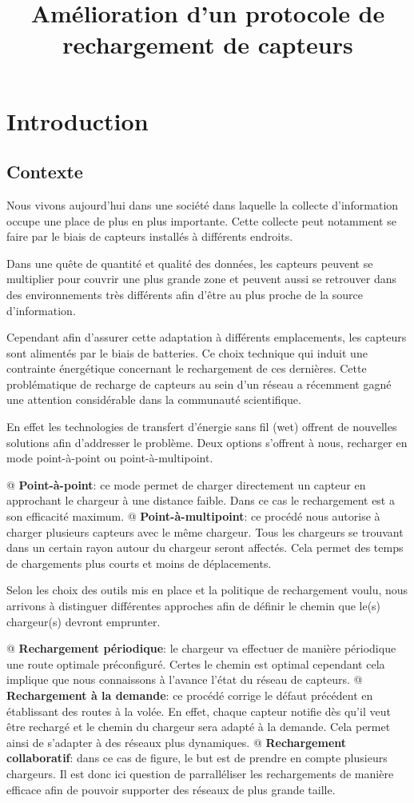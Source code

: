 \documentclass[noposter]{polytech}
\title{Amélioration d'un protocole de rechargement de capteurs}
\begin{document}
\chapter{Introduction}
	\section{Contexte}%
		Nous vivons aujourd'hui dans une société dans laquelle la collecte d'information occupe une place de plus en plus importante.
		Cette collecte peut notamment se faire par le biais de capteurs installés à différents endroits.
		
		
		Dans une quête de quantité et qualité des données, les capteurs peuvent se multiplier pour couvrir une plus grande zone et peuvent aussi se retrouver dans des environnements très différents afin d'être au plus proche de la source d'information.
		
		Cependant afin d'assurer cette adaptation à différents emplacements, les capteurs sont alimentés par le biais de batteries. 
		Ce choix technique qui induit une contrainte énergétique concernant le rechargement de ces dernières.
		Cette problématique de recharge de capteurs au sein d'un réseau a récemment gagné une attention considérable dans la communauté scientifique.
		
		En effet les technologies de transfert d'énergie sans fil (\gls{wet}) offrent de nouvelles solutions afin d'addresser le problème.
		Deux options s'offrent à nous, recharger en mode point-à-point ou point-à-multipoint.
		\begin{easylist}[itemize]
			@ \textbf{Point-à-point}: ce mode permet de charger directement un capteur en approchant le chargeur à une distance faible.
			Dans ce cas le rechargement est a son efficacité maximum.
			@ \textbf{Point-à-multipoint}: ce procédé nous autorise à charger plusieurs capteurs avec le même chargeur.
			Tous les chargeurs se trouvant dans un certain rayon autour du chargeur seront affectés.
			Cela permet des temps de chargements plus courts et moins de déplacements.
		\end{easylist}
	
		Selon les choix des outils mis en place et la politique de rechargement voulu, nous arrivons à distinguer différentes approches afin de définir le chemin que le(s) chargeur(s) devront emprunter.
		\begin{easylist}[itemize]
			@ \textbf{Rechargement périodique}: le chargeur va effectuer de manière périodique une route optimale préconfiguré.
			Certes le chemin est optimal cependant cela implique que nous connaissons à l'avance l'état du réseau de capteurs.
			@ \textbf{Rechargement à la demande}: ce procédé corrige le défaut précédent en établissant des routes à la volée.
			En effet, chaque capteur notifie dès qu'il veut être rechargé et le chemin du chargeur sera adapté à la demande.
			Cela permet ainsi de s'adapter à des réseaux plus dynamiques.
			@ \textbf{Rechargement collaboratif}: dans ce cas de figure, le but est de prendre en compte plusieurs chargeurs.
			Il est donc ici question de parralléliser les rechargements de manière efficace afin de pouvoir supporter des réseaux de plus grande taille. 
		\end{easylist}
	
\end{document}
